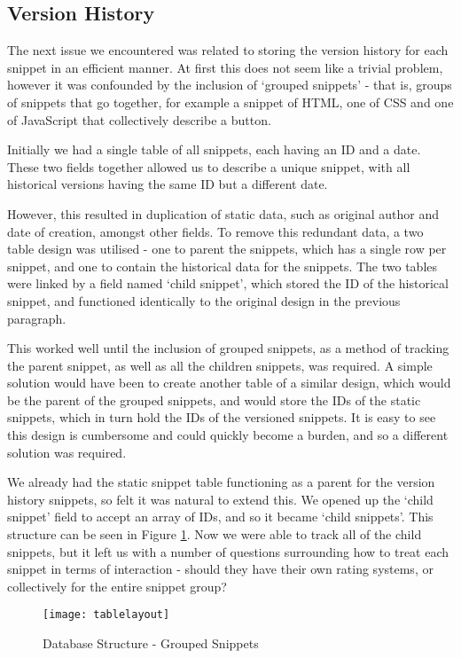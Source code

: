 \subsection{Version History}
The next issue we encountered was related to storing the version history for each snippet in an efficient manner.
At first this does not seem like a trivial problem, however it was confounded by the inclusion of `grouped snippets' - that is, groups of snippets that go together, for example a snippet of HTML, one of CSS and one of JavaScript that collectively describe a button.

Initially we had a single table of all snippets, each having an ID and a date. 
These two fields together allowed us to describe a unique snippet, with all historical versions having the same ID but a different date.

However, this resulted in duplication of static data, such as original author and date of creation, amongst other fields.
To remove this redundant data, a two table design was utilised - one to parent the snippets, which has a single row per snippet, and one to contain the historical data for the snippets.
The two tables were linked by a field named `child snippet', which stored the ID of the historical snippet, and functioned identically to the original design in the previous paragraph.

This worked well until the inclusion of grouped snippets, as a method of tracking the parent snippet, as well as all the children snippets, was required.
A simple solution would have been to create another table of a similar design, which would be the parent of the grouped snippets, and would store the IDs of the static snippets, which in turn hold the IDs of the versioned snippets.
It is easy to see this design is cumbersome and could quickly become a burden, and so a different solution was required.

We already had the static snippet table functioning as a parent for the version history snippets, so felt it was natural to extend this.
We opened up the `child snippet' field to accept an array of IDs, and so it became `child snippets'.
This structure can be seen in Figure \ref{tablelayout}.
Now we were able to track all of the child snippets, but it left us with a number of questions surrounding how to treat each snippet in terms of interaction - should they have their own rating systems, or collectively for the entire snippet group?

\begin{figure}[htb!]
  \centering
  \texttt{[image: tablelayout]}
  \caption{Database Structure - Grouped Snippets \label{tablelayout}}
\end{figure}

